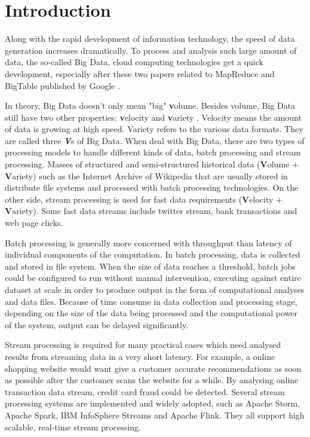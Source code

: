 \chapter{Introduction}
\label{chapter:intro}

Along with the rapid development of information technology, the speed of data generation increases dramatically. To process and analysis such large amount of data, the so-called Big Data,  cloud computing technologies get a quick development,  especially after these two papers related to MapReduce and BigTable published by Google  \cite{chang2006bigtable, dean2008mapreduce}.

In theory, Big Data doesn't only mean "big" \textbf{v}olume. Besides volume, Big Data still have two other properties: \textbf{v}elocity and \textbf{v}ariety \cite{doug2001data}. Velocity means the amount of data is growing at high speed. Variety refers to the various data formats. They are called three \textbf{\textit{V}}s of Big Data.  When deal with Big Data, there are two types of processing models to handle different kinds of data, batch processing and stream processing. Masses of structured and semi-structured historical data (\textbf{V}olume + \textbf{V}ariety) such as the Internet Archive of Wikipedia that are usually stored in distribute file systems and processed with batch processing technologies. On the other side, stream processing is used for fast data requirements (\textbf{V}elocity + \textbf{V}ariety)\cite{GameChanger}. Some fast data streams include twitter stream, bank transactions and web page clicks.

Batch processing is generally more concerned with throughput than latency of individual components of the computation. In batch processing, data is collected and stored in file system. When the size of data reaches a threshold, batch jobs could be configured to run without manual intervention, executing against entire dataset at scale in order to produce output in the form of computational analyses and data files. Because of time consume in data collection and processing stage, depending on the size of the data being processed and the computational power of the system, output can be delayed significantly.

Stream processing is required for many practical cases which need analysed results from streaming data in a very short latency. For example, a online shopping website would want give a customer accurate recommendations as soon as possible after the customer scans the website for a while. By analysing online transaction data stream, credit card fraud could be detected. Several stream processing systems are implemented and widely adopted, such as Apache Storm, Apache Spark, IBM InfoSphere Streams and Apache Flink. They all support high scalable, real-time stream processing. 

